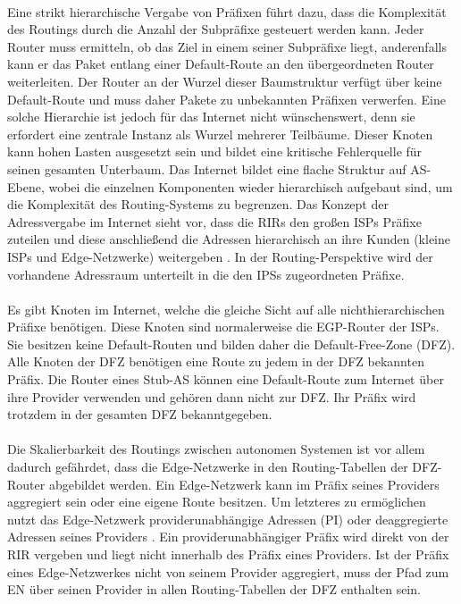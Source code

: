 \paragraph{}
Eine strikt hierarchische Vergabe von Präfixen führt dazu, dass die Komplexität des Routings durch die Anzahl der Subpräfixe gesteuert werden kann. Jeder Router muss ermitteln, ob das Ziel in einem seiner Subpräfixe liegt, anderenfalls kann er das Paket entlang einer Default-Route an den übergeordneten Router weiterleiten. Der Router an der Wurzel dieser Baumstruktur verfügt über keine Default-Route und muss daher Pakete zu unbekannten Präfixen verwerfen. Eine solche Hierarchie ist jedoch für das Internet nicht wünschenswert, denn sie erfordert eine zentrale Instanz als Wurzel mehrerer Teilbäume. Dieser Knoten kann hohen Lasten ausgesetzt sein und bildet eine kritische Fehlerquelle für seinen gesamten Unterbaum. Das Internet bildet eine flache Struktur auf AS-Ebene, wobei die einzelnen Komponenten wieder hierarchisch aufgebaut sind, um die Komplexität des Routing-Systems zu begrenzen. Das Konzept der Adressvergabe im Internet sieht vor, dass die RIRs den großen ISPs Präfixe zuteilen und diese anschließend die Adressen hierarchisch an ihre Kunden (kleine ISPs und Edge-Netzwerke) weitergeben \cite{ripe:ipv4}. In der Routing-Perspektive wird der vorhandene Adressraum unterteilt in die den IPSs zugeordneten Präfixe. 

\paragraph{}
Es gibt Knoten im Internet, welche die gleiche Sicht auf alle nichthierarchischen Präfixe benötigen. Diese Knoten sind normalerweise die EGP-Router der ISPs. Sie besitzen keine Default-Routen und bilden daher die Default-Free-Zone (DFZ). Alle Knoten der DFZ benötigen eine Route zu jedem in der DFZ bekannten Präfix. Die Router eines Stub-AS können eine Default-Route zum Internet über ihre Provider verwenden und gehören dann nicht zur DFZ. Ihr Präfix wird trotzdem in der gesamten DFZ bekanntgegeben. 

\paragraph{}
Die Skalierbarkeit des Routings zwischen autonomen Systemen ist vor allem dadurch gefährdet, dass die Edge-Netzwerke in den Routing-Tabellen der DFZ-Router abgebildet werden.
Ein Edge-Netzwerk kann im Präfix seines Providers aggregiert sein oder eine eigene Route besitzen. Um letzteres zu ermöglichen nutzt das Edge-Netzwerk  providerunabhängige Adressen (PI) oder deaggregierte Adressen seines Providers \cite{jen:2008:start}. Ein providerunabhängiger Präfix wird direkt von der RIR vergeben und liegt nicht innerhalb des Präfix eines Providers. Ist der Präfix eines Edge-Netzwerkes nicht von seinem Provider aggregiert, muss der Pfad zum EN über seinen Provider in allen Routing-Tabellen der DFZ enthalten sein.

